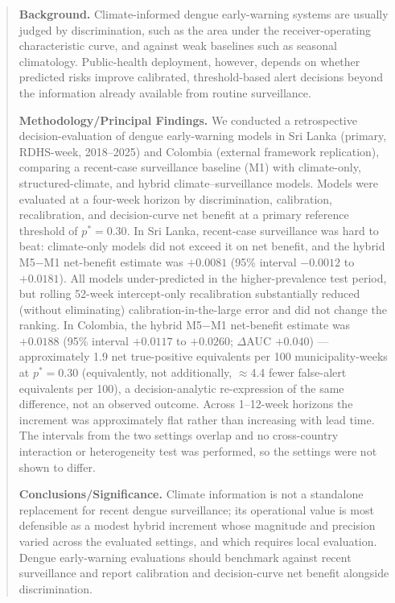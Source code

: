 \documentclass[11pt,a4paper]{article}
\begin{document}
\begin{abstract}
\noindent\textbf{Background.}
Climate-informed dengue early-warning systems are usually judged by discrimination, such as the area under the receiver-operating characteristic curve, and against weak baselines such as seasonal climatology. Public-health deployment, however, depends on whether predicted risks improve calibrated, threshold-based alert decisions beyond the information already available from routine surveillance.

\noindent\textbf{Methodology/Principal Findings.}
We conducted a retrospective decision-evaluation of dengue early-warning models in Sri Lanka (primary, RDHS-week, 2018--2025) and Colombia (external framework replication), comparing a recent-case surveillance baseline (M1) with climate-only, structured-climate, and hybrid climate--surveillance models. Models were evaluated at a four-week horizon by discrimination, calibration, recalibration, and decision-curve net benefit at a primary reference threshold of $p^*=0.30$. In Sri Lanka, recent-case surveillance was hard to beat: climate-only models did not exceed it on net benefit, and the hybrid M5$-$M1 net-benefit estimate was $+0.0081$ (95\% interval $-0.0012$ to $+0.0181$). All models under-predicted in the higher-prevalence test period, but rolling 52-week intercept-only recalibration substantially reduced (without eliminating) calibration-in-the-large error and did not change the ranking. In Colombia, the hybrid M5$-$M1 net-benefit estimate was $+0.0188$ (95\% interval $+0.0117$ to $+0.0260$; $\Delta$AUC $+0.040$) --- approximately 1.9 net true-positive equivalents per 100 municipality-weeks at $p^*=0.30$ (equivalently, not additionally, $\approx$4.4 fewer false-alert equivalents per 100), a decision-analytic re-expression of the same difference, not an observed outcome. Across 1--12-week horizons the increment was approximately flat rather than increasing with lead time. The intervals from the two settings overlap and no cross-country interaction or heterogeneity test was performed, so the settings were not shown to differ.

\noindent\textbf{Conclusions/Significance.}
Climate information is not a standalone replacement for recent dengue surveillance; its operational value is most defensible as a modest hybrid increment whose magnitude and precision varied across the evaluated settings, and which requires local evaluation. Dengue early-warning evaluations should benchmark against recent surveillance and report calibration and decision-curve net benefit alongside discrimination.
\end{abstract}
\end{document}
